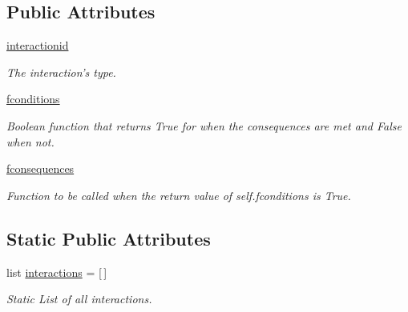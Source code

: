 \subsection*{\-Public \-Attributes}
\begin{DoxyCompactItemize}
\item 
\hyperlink{classInteraction_1_1Interaction_a4ae95a9c2a0388249c5b065815b68f8b}{interactionid}
\begin{DoxyCompactList}\small\item\em \-The interaction's type. \end{DoxyCompactList}\item 
\hypertarget{classInteraction_1_1Interaction_a56fd6f0fdefe07f2546b60181e2875b0}{\hyperlink{classInteraction_1_1Interaction_a56fd6f0fdefe07f2546b60181e2875b0}{fconditions}}\label{classInteraction_1_1Interaction_a56fd6f0fdefe07f2546b60181e2875b0}

\begin{DoxyCompactList}\small\item\em \-Boolean function that returns \-True for when the consequences are met and \-False when not. \end{DoxyCompactList}\item 
\hypertarget{classInteraction_1_1Interaction_aa05197f150e37ab276c2b42572ceb42d}{\hyperlink{classInteraction_1_1Interaction_aa05197f150e37ab276c2b42572ceb42d}{fconsequences}}\label{classInteraction_1_1Interaction_aa05197f150e37ab276c2b42572ceb42d}

\begin{DoxyCompactList}\small\item\em \-Function to be called when the return value of self.\-fconditions is \-True. \end{DoxyCompactList}\end{DoxyCompactItemize}
\subsection*{\-Static \-Public \-Attributes}
\begin{DoxyCompactItemize}
\item 
\hypertarget{classInteraction_1_1Interaction_a912f1f2d276a30d733e2183093b47d0f}{list \hyperlink{classInteraction_1_1Interaction_a912f1f2d276a30d733e2183093b47d0f}{interactions} = \mbox{[}$\,$\mbox{]}}\label{classInteraction_1_1Interaction_a912f1f2d276a30d733e2183093b47d0f}

\begin{DoxyCompactList}\small\item\em \-Static \-List of all interactions. \end{DoxyCompactList}\end{DoxyCompactItemize}


